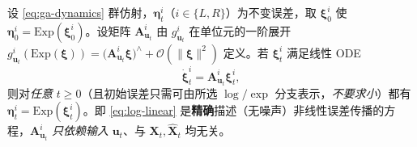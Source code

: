 \begin{theorem}\label{thm:log-linear}
设 \cref{eq:ga-dynamics} 群仿射，$\boldsymbol{\eta}^i_t$（$i\in\{L,R\}$）为不变误差，取 $\boldsymbol{\xi}^i_0$ 使 $\boldsymbol{\eta}^i_0=\mathrm{Exp}(\boldsymbol{\xi}^i_0)$。设矩阵 $\mathbf{A}^i_{\mathbf{u}_t}$ 由 $g^i_{\mathbf{u}_t}$ 在单位元的一阶展开 $g^i_{\mathbf{u}_t}(\mathrm{Exp}(\boldsymbol{\xi}))=\big(\mathbf{A}^i_{\mathbf{u}_t}\boldsymbol{\xi}\big)^\wedge+\mathcal{O}(\|\boldsymbol{\xi}\|^2)$ 定义。若 $\boldsymbol{\xi}^i_t$ 满足线性 ODE
\begin{equation}
  \dot{\boldsymbol{\xi}}^i_t=\mathbf{A}^i_{\mathbf{u}_t}\boldsymbol{\xi}^i_t,
  \label{eq:log-linear}
\end{equation}
则对\emph{任意} $t\ge0$（且初始误差只需可由所选 $\log/\exp$ 分支表示，\emph{不要求小}）都有 $\boldsymbol{\eta}^i_t=\mathrm{Exp}(\boldsymbol{\xi}^i_t)$。即 \cref{eq:log-linear} 是\textbf{精确}描述（无噪声）非线性误差传播的方程，$\mathbf{A}^i_{\mathbf{u}_t}$ \emph{只依赖输入} $\mathbf{u}_t$、与 $\mathbf{X}_t,\hat{\mathbf{X}}_t$ 均无关。
\end{theorem}

